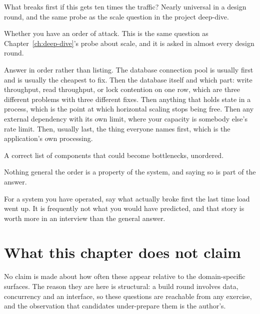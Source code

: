 \begin{bankq}{What breaks first if this gets ten times the traffic?}
\qasked
Nearly universal in a design round, and the same probe as the scale question
in the project deep-dive.

\qtested
Whether you have an order of attack. This is the same question as
Chapter~\ref{ch:deep-dive}'s probe about scale, and it is asked in almost every
design round.

\qstaff
Answer in order rather than listing. The database connection pool is usually
first and is usually the cheapest to fix. Then the database itself \dash{} and
which part: write throughput, read throughput, or lock contention on one row,
which are three different problems with three different fixes. Then anything
that holds state in a process, which is the point at which horizontal scaling
stops being free. Then any external dependency with its own limit, where your
capacity is somebody else's rate limit. Then, usually last, the thing everyone
names first, which is the application's own processing.


\qsenior
A correct list of components that could become bottlenecks, unordered.

\qcontested
Nothing general \dash{} the order is a property of the system, and saying so is
part of the answer.

\qdrill
For a system you have operated, say what actually broke first the last time
load went up. It is frequently not what you would have predicted, and that
story is worth more in an interview than the general answer.
\end{bankq}

\section*{What this chapter does not claim}

No claim is made about how often these appear relative to the domain-specific
surfaces. The reason they are here is structural: a build round involves data,
concurrency and an interface, so these questions are reachable from any
exercise, and the observation that candidates under-prepare them is the
author's.

